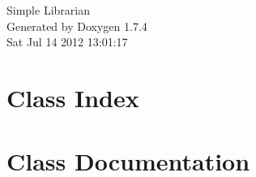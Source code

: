 \documentclass[a4paper]{book}
\begin{document}
\hypersetup{pageanchor=false}
\begin{titlepage}
\vspace*{7cm}
\begin{center}
{\Large Simple Librarian }\\
\vspace*{1cm}
{\large Generated by Doxygen 1.7.4}\\
\vspace*{0.5cm}
{\small Sat Jul 14 2012 13:01:17}\\
\end{center}
\end{titlepage}
\clearemptydoublepage
{}
\tableofcontents
\clearemptydoublepage
{}
\hypersetup{pageanchor=true}
\chapter{Class Index}

\chapter{Class Documentation}


















\printindex
\end{document}
